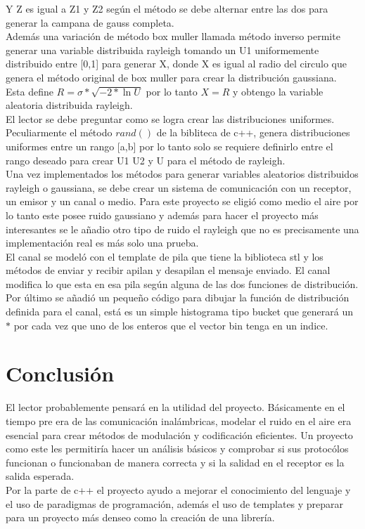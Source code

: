 \documentclass[letterpaper]{article}
\begin{document}
Y Z es igual a Z1 y Z2 según el método se debe alternar entre las dos para generar la campana de gauss completa.\\

Además una variación de método box muller llamada método inverso permite generar una variable distribuida rayleigh tomando un U1 uniformemente distribuido entre [0,1] para generar X, donde X es igual al radio del circulo que genera el método original de box muller para crear la distribución gaussiana.\\

Esta define $ R = \sigma * \sqrt{-2*\ln U}$ por lo tanto $X=R$ y obtengo la variable aleatoria distribuida rayleigh.\cite{Marsaglia}\\

El lector se debe preguntar como se logra crear las distribuciones uniformes. Peculiarmente el método $rand()$ de la bibliteca de c++, genera distribuciones uniformes entre un rango [a,b] por lo tanto solo se requiere definirlo entre el rango deseado para crear U1 U2 y U para el método de rayleigh. \\
\newpage
Una vez implementados los métodos para generar variables aleatorios distribuidos rayleigh o gaussiana, se debe crear un sistema de comunicación con un receptor, un emisor y un canal o medio. Para este proyecto se eligió como medio el aire por lo tanto este posee ruido gaussiano y además para hacer el proyecto más interesantes se le añadio otro tipo de ruido el rayleigh que no es precisamente una implementación real es más solo una prueba.\\

El canal se modeló con el template de pila que tiene la biblioteca stl y los métodos de enviar y recibir apilan y desapilan el mensaje enviado. El canal modifica lo que esta en esa pila según alguna de las dos funciones de distribución.\\

Por último se añadió un pequeño código para dibujar la función de distribución definida para el canal, está es un simple histograma tipo bucket que generará un $*$ por cada vez que uno de los enteros que el vector bin tenga en un indice.\\

\newpage 

\section{Conclusión}

El lector probablemente pensará en la utilidad del proyecto. Básicamente en el tiempo pre era de las comunicación inalámbricas, modelar el ruido en el aire era esencial para crear métodos de modulación y codificación eficientes. Un proyecto como este les permitiría hacer un análisis básicos y comprobar si sus protocólos funcionan o funcionaban de manera correcta y si la salidad en el receptor es la salida esperada. \\
Por la parte de c++ el proyecto ayudo a mejorar el conocimiento del lenguaje y el uso de paradigmas de programación, además el uso de templates y preparar para un proyecto más denseo como la creación de una librería.


\newpage


\end{document}
